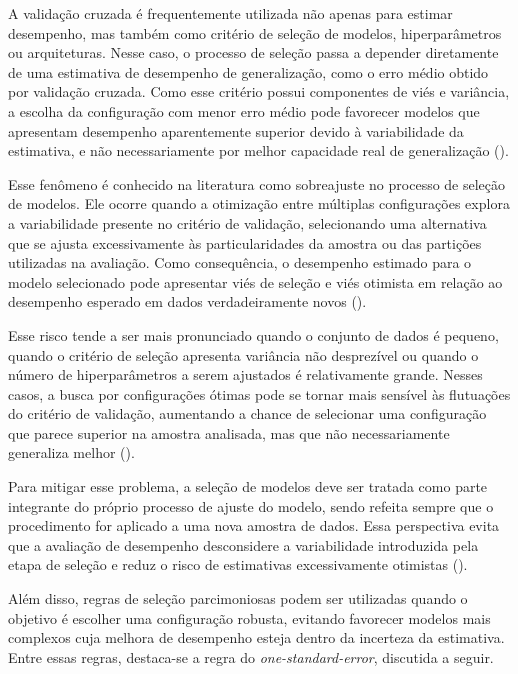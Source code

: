 A validação cruzada é frequentemente utilizada não apenas para estimar desempenho, mas também como critério de seleção de modelos, hiperparâmetros ou arquiteturas. Nesse caso, o processo de seleção passa a depender diretamente de uma estimativa de desempenho de generalização, como o erro médio obtido por validação cruzada. Como esse critério possui componentes de viés e variância, a escolha da configuração com menor erro médio pode favorecer modelos que apresentam desempenho aparentemente superior devido à variabilidade da estimativa, e não necessariamente por melhor capacidade real de generalização (\cite{Cawley2010Overfitting}).

Esse fenômeno é conhecido na literatura como sobreajuste no processo de seleção de modelos. Ele ocorre quando a otimização entre múltiplas configurações explora a variabilidade presente no critério de validação, selecionando uma alternativa que se ajusta excessivamente às particularidades da amostra ou das partições utilizadas na avaliação. Como consequência, o desempenho estimado para o modelo selecionado pode apresentar viés de seleção e viés otimista em relação ao desempenho esperado em dados verdadeiramente novos (\cite{Cawley2010Overfitting}).

Esse risco tende a ser mais pronunciado quando o conjunto de dados é pequeno, quando o critério de seleção apresenta variância não desprezível ou quando o número de hiperparâmetros a serem ajustados é relativamente grande. Nesses casos, a busca por configurações ótimas pode se tornar mais sensível às flutuações do critério de validação, aumentando a chance de selecionar uma configuração que parece superior na amostra analisada, mas que não necessariamente generaliza melhor (\cite{Cawley2010Overfitting}).

Para mitigar esse problema, a seleção de modelos deve ser tratada como parte integrante do próprio processo de ajuste do modelo, sendo refeita sempre que o procedimento for aplicado a uma nova amostra de dados. Essa perspectiva evita que a avaliação de desempenho desconsidere a variabilidade introduzida pela etapa de seleção e reduz o risco de estimativas excessivamente otimistas (\cite{Cawley2010Overfitting}).

Além disso, regras de seleção parcimoniosas podem ser utilizadas quando o objetivo é escolher uma configuração robusta, evitando favorecer modelos mais complexos cuja melhora de desempenho esteja dentro da incerteza da estimativa. Entre essas regras, destaca-se a regra do \textit{one-standard-error}, discutida a seguir.
